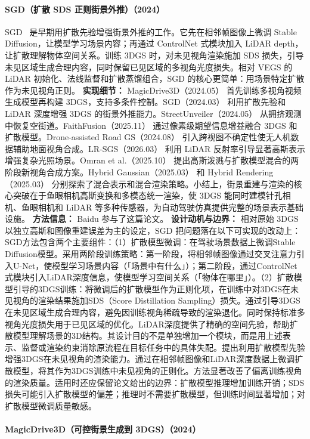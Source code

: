 \paragraph{SGD（扩散 SDS 正则街景外推）（2024）}
SGD~\cite{2403_20079} 是早期用扩散先验增强街景外推的工作。它先在相邻帧图像上微调 Stable Diffusion，让模型学习场景内容；再通过 ControlNet 式模块加入 LiDAR depth，让扩散理解物体空间关系。训练 3DGS 时，对未见视角渲染施加 SDS 损失，引导未见区域生成合理内容，同时保留已见区域的多视角光度损失。相对 VEGS 的 LiDAR 初始化、法线监督和扩散蒸馏组合，SGD 的核心更简单：用场景特定扩散作为未见视角正则。
\textbf{实现细节：} MagicDrive3D（2024.05） 首先训练多视角视频生成模型再构建 3DGS，支持多条件控制。SGD（2024.03） 利用扩散先验和 LiDAR 深度增强 3DGS 的街景外推能力。StreetUnveiler（2024.05） 从拥挤观测中恢复空街道。FaithFusion（2025.11） 通过像素级期望信息增益融合 3DGS 和扩散模型。Drone-assisted Road GS（2024.08） 引入跨视图不确定性使无人机数据辅助地面视角合成。LR-SGS（2026.03） 利用 LiDAR 反射率引导显著高斯表示增强复杂光照场景。Omran et al.（2025.10） 提出高斯泼溅与扩散模型混合的两阶段新视角合成方案。Hybrid Gaussian（2025.03） 和 Hybrid Rendering（2025.03） 分别探索了混合表示和混合渲染策略。小结上，街景重建与渲染的核心突破在于鱼眼相机高斯变换和多模态统一渲染，使 3DGS 能同时建模针孔相机、鱼眼相机和 LiDAR 等多种传感器，为自动驾驶仿真提供完整的场景表示基础设施。
\textbf{方法信息：} Baidu 参与了这篇论文。
\textbf{设计动机与边界：} 相对原始 3DGS 以独立高斯和图像重建误差为主的设定，SGD 把问题落在以下可实现的改动上：SGD方法包含两个主要组件：（1）扩散模型微调：在驾驶场景数据上微调Stable Diffusion模型。采用两阶段训练策略：第一阶段，将相邻帧图像通过交叉注意力引入U-Net，使模型学习场景内容（「场景中有什么」）；第二阶段，通过ControlNet式模块引入LiDAR深度信息，使模型学习空间关系（「物体在哪里」）。（2）扩散模型引导的3DGS训练：将微调后的扩散模型作为正则化项，在训练中对3DGS在未见视角的渲染结果施加SDS（Score Distillation Sampling）损失。通过引导3DGS在未见区域生成合理内容，避免因训练视角稀疏导致的渲染退化。同时保持标准多视角光度损失用于已见区域的优化。LiDAR深度提供了精确的空间先验，帮助扩散模型理解场景的3D结构。其设计目的不是单独增加一个模块，而是用上述表示、监督或渲染约束消除原流程在目标任务中的具体失配。提出利用扩散模型先验增强3DGS在未见视角的渲染能力。通过在相邻帧图像和LiDAR深度数据上微调扩散模型，将其作为3DGS训练中未见视角的正则化。方法显著改善了偏离训练视角的渲染质量。适用时还应保留论文给出的边界：扩散模型推理增加训练开销；SDS损失可能引入扩散模型的偏差；推理时不需要扩散模型，但训练时间显著增加；对扩散模型微调质量敏感。
\paragraph{MagicDrive3D（可控街景生成到 3DGS）（2024）}

